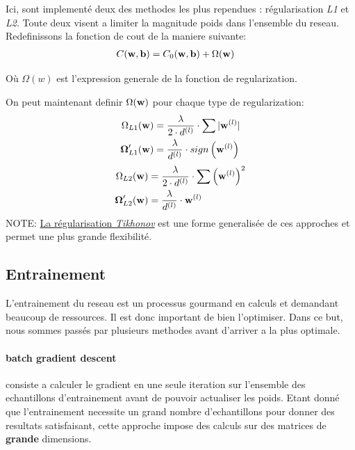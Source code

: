 \documentclass[11pt]{article}
\begin{document}
Ici, sont implement\'e deux des methodes les plus rependues :
r\'egularisation \emph{L1} et \emph{L2}. Toute deux visent a limiter
la magnitude poids dans l'ensemble du reseau.
Redefinissons la fonction de cout de la maniere suivante:
\begin{equation}
	\begin{aligned}
		C({\bf w}, {\bf b}) &= C_0({\bf w}, {\bf b}) + \Omega({\bf w})
	\end{aligned}
\end{equation}

O\`u $\Omega(w)$ est l'expression generale de la fonction de regularization.

On peut maintenant definir $\Omega({\bf w})$ pour chaque type de regularization:
\begin{equation}
	\begin{aligned}
		\Omega_{L1} ({\bf w}) &= \frac{\lambda}{2\cdot d^{(l)}} \cdot \sum{|{\bf w}^{(l)}|}\\
		\boldsymbol\Omega_{L1}'({\bf w}) &= \frac{\lambda}{d^{(l)}} \cdot sign\left ({\bf w}^{(l)} \right)\\
	\end{aligned}
\end{equation}
\begin{equation}
	\begin{aligned}
		\Omega_{L2} ({\bf w}) &= \frac{\lambda}{2\cdot d^{(l)}} \cdot \sum{\left({\bf w}^{(l)}\right) ^2}\\
		\boldsymbol\Omega_{L2}'({\bf w}) &= \frac{\lambda}{d^{(l)}} \cdot {\bf w}^{(l)}\\
	\end{aligned}
\end{equation}
NOTE: \href{http://work.caltech.edu/slides/slides12.pdf}{La r\'egularisation
\emph{Tikhonov}} est une forme generalis\'ee de ces approches et permet une
plus grande flexibilit\'e.

\subsection{Entrainement}
L'entrainement du reseau est un processus gourmand en calculs et demandant
beaucoup de ressources. Il est donc important de bien l'optimiser. Dans ce but,
nous sommes pass\'es par plusieurs methodes avant d'arriver a la plus optimale.

\paragraph{batch gradient descent} consiste a calculer le gradient en une seule
iteration sur l'ensemble des echantillons d'entrainement avant de pouvoir
actualiser les poids. Etant donn\'e que l'entrainement necessite un grand
nombre d'echantillons pour donner des resultats satisfaisant, cette approche
impose des calculs sur des matrices de {\bf grande} dimensions.
\end{document}
